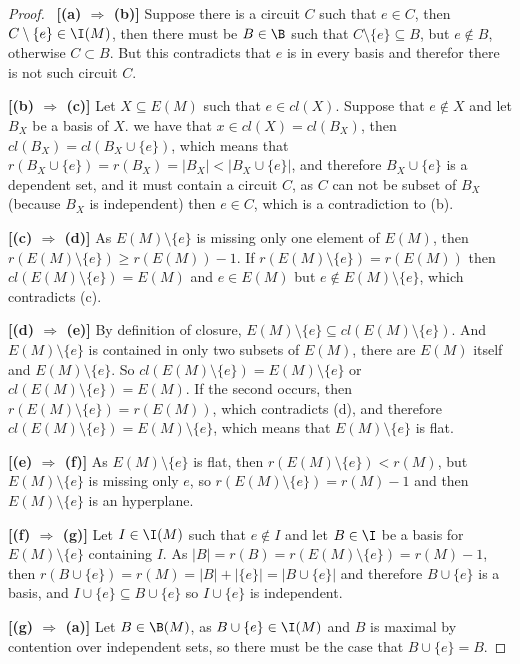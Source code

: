 \begin{proof}
    $\,$\pn
    \textbf{[(a) $\Rightarrow$ (b)]} \pn
        Suppose there is a circuit $C$ such that $e \in C$, then $C \setminus \{ e \} \in \I(M)$, then
        there must be $B \in \B$ such that $C \setminus \{ e \} \subseteq B$, but $e \not\in B$, otherwise
        $C \subset B$. But this contradicts that $e$ is in every basis and therefor there is not such 
        circuit $C$.\pn
        
    \textbf{[(b) $\Rightarrow$ (c)]} \pn
        Let $X \subseteq E(M)$ such that $e \in cl(X)$. Suppose that $e \notin X$ and let $B_X$ be a basis of $X$.
        we have that $x \in cl(X) = cl(B_X)$, then $cl(B_X) = cl(B_X \cup \{ e \})$, which means that
        $r(B_X \cup \{ e \}) = r(B_X) = |B_X| < |B_X \cup \{ e \}|$, and therefore $B_X \cup \{ e \}$ is a dependent set,
        and it must contain a circuit $C$, as $C$ can not be subset of $B_X$ (because $B_X$ is independent) then $e \in C$,
        which is a contradiction to (b).\pn

    
    \textbf{[(c) $\Rightarrow$ (d)]} \pn
        As $E(M) \setminus \{e\}$ is missing only one element of $E(M)$, then $r(E(M) \setminus \{e\}) \geq r(E(M)) - 1$.
        If $r(E(M) \setminus \{e\}) = r(E(M))$ then $cl(E(M) \setminus \{e\}) = E(M)$ and $e \in E(M)$ but $e \notin E(M) \setminus \{e\}$,
        which contradicts (c).\pn
        
    \textbf{[(d) $\Rightarrow$ (e)]} \pn
        By definition of closure, $E(M) \setminus \{ e \} \subseteq cl(E(M) \setminus \{ e \})$. And $E(M) \setminus \{ e \}$ is contained in only
        two subsets of $E(M)$, there are $E(M)$ itself and $E(M) \setminus \{ e \}$. So $cl(E(M) \setminus \{ e \}) = E(M) \setminus \{ e \}$ or
        $cl(E(M) \setminus \{ e \}) = E(M)$. If the second occurs, then $r(E(M) \setminus \{ e \}) = r(E(M))$, which contradicts (d), and therefore
        $cl(E(M) \setminus \{ e \}) = E(M) \setminus \{ e \}$, which means that $E(M) \setminus \{ e \}$ is flat.\pn
        
    \textbf{[(e) $\Rightarrow$ (f)]} \pn
        As $E(M) \setminus \{ e \}$ is flat, then $r(E(M) \setminus \{ e \}) < r(M)$, but $E(M) \setminus \{ e \}$ is missing only $e$, so 
        $r(E(M) \setminus \{ e \}) = r(M) - 1$ and then $E(M) \setminus \{ e \}$ is an hyperplane.\pn
        
    \textbf{[(f) $\Rightarrow$ (g)]} \pn
        Let $I \in \I(M)$ such that $e \notin I$ and let $B \in \I$ be a basis for $E(M) \setminus \{ e \}$ containing $I$. 
        As $|B| = r(B) = r(E(M) \setminus \{ e \}) = r(M) - 1$, then $r(B \cup \{ e \}) = r(M) = |B| + |\{ e \}| = |B \cup \{ e \}|$ and therefore
        $B \cup \{e\}$ is a basis, and $I \cup \{ e \} \subseteq B \cup \{ e \}$ so $I \cup \{e\}$ is independent.

    \textbf{[(g) $\Rightarrow$ (a)]} \pn
        Let $B \in \B(M)$, as $B \cup \{ e \} \in \I(M)$ and $B$ is maximal by contention over independent sets, so there must be the case that
        $B \cup  \{ e \} = B$.
        
\end{proof}